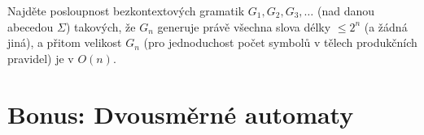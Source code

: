 \documentclass[a4paper,12pt]{amsart}
\begin{document}
\medskip\begin{problem}
    
    Najděte posloupnost bezkontextových gramatik $G_1,G_2,G_3,\dots$ (nad danou abecedou $\Sigma$) takových, že $G_n$ generuje právě všechna slova délky $\leq 2^n$ (a žádná jiná), a přitom velikost $G_n$ (pro jednoduchost počet symbolů v tělech produkčních pravidel) je v $O(n)$.
    

\end{problem}


\bigskip


\section*{Bonus: Dvousměrné automaty}
\end{document}
